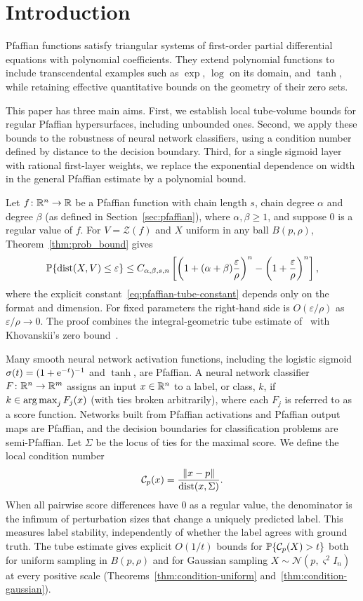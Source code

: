 \section{Introduction}
Pfaffian functions satisfy triangular systems of first-order partial differential equations with polynomial coefficients. They extend polynomial functions to include transcendental examples such as $\exp$, $\log$ on its domain, and $\tanh$, while retaining effective quantitative bounds on the geometry of their zero sets.

This paper has three main aims. First, we establish local tube-volume bounds for regular Pfaffian hypersurfaces, including unbounded ones. Second, we apply these bounds to the robustness of neural network classifiers, using a condition number defined by distance to the decision boundary. Third, for a single sigmoid layer with rational first-layer weights, we replace the exponential dependence on width in the general Pfaffian estimate by a polynomial bound.

Let $f\colon \mathbb{R}^n\to \mathbb{R}$ be a Pfaffian function with chain length $s$, chain degree $\alpha$ and degree $\beta$ (as defined in Section~\ref{sec:pfaffian}), where $\alpha,\beta\ge1$, and suppose $0$ is a regular value of $f$. For $V=\mathcal Z(f)$ and $X$ uniform in any ball $B(p,\rho)$, Theorem~\ref{thm:prob_bound} gives
\[
\operatorname*{\mathbb{P}}\{\operatorname{dist}(X,V)\le\varepsilon\}
\le C_{\alpha,\beta,s,n}
\left[\left(1+(\alpha+\beta)\frac{\varepsilon}{\rho}\right)^n
-\left(1+\frac{\varepsilon}{\rho}\right)^n\right],
\]
where the explicit constant~\eqref{eq:pfaffian-tube-constant} depends only on the format and dimension. For fixed parameters the right-hand side is $O(\varepsilon/\rho)$ as $\varepsilon/\rho\to0$. The proof combines the integral-geometric tube estimate of~\cite{lotz2015volume} with Khovanskii's zero bound~\cite{khovanskii1991fewnomials}. 

Many smooth neural network activation functions, including the logistic sigmoid $\sigma(t)=(1+\mathrm{e}^{-t})^{-1}$ and $\tanh$, are Pfaffian. A neural network classifier $F\colon\mathbb{R}^n\to\mathbb{R}^m$ assigns an input $x\in \mathbb{R}^n$ to a label, or class, $k$, if $k\in \operatorname*{arg\,max}_j F_j(x)$ (with ties broken arbitrarily), where each $F_j$ is referred to as a score function. Networks built from Pfaffian activations and Pfaffian output maps are Pfaffian, and the decision boundaries for classification problems are semi-Pfaffian. Let $\Sigma$ be the locus of ties for the maximal score. We define the local condition number
\[
\mathcal{C}_p(x)=\frac{\|x-p\|}{\operatorname{dist}(x,\Sigma)}.
\]
When all pairwise score differences have $0$ as a regular value, the denominator is the infimum of perturbation sizes that change a uniquely predicted label. This measures label stability, independently of whether the label agrees with ground truth. The tube estimate gives explicit $O(1/t)$ bounds for $\operatorname*{\mathbb{P}}\{\mathcal{C}_p(X)>t\}$ both for uniform sampling in $B(p,\rho)$ and for Gaussian sampling $X\sim\mathcal N(p,\varsigma^2 I_n)$ at every positive scale (Theorems~\ref{thm:condition-uniform} and~\ref{thm:condition-gaussian}).

